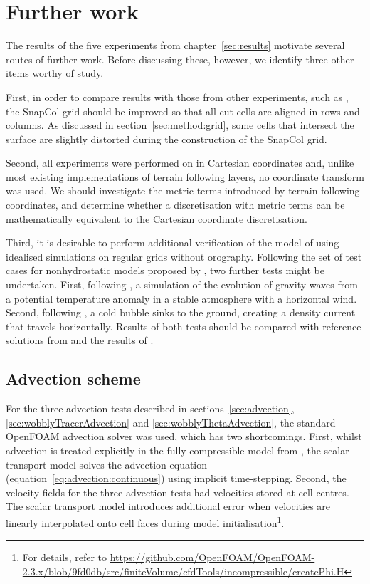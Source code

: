 \chapter{Further work} \label{sec:further-work}
The results of the five experiments from chapter~\ref{sec:results} motivate several routes of further work.  Before discussing these, however, we identify three other items worthy of study.

First, in order to compare results with those from other experiments, such as \textcite{good2013}, the SnapCol grid should be improved so that all cut cells are aligned in rows and columns.  As discussed in section~\ref{sec:method:grid}, some cells that intersect the surface are slightly distorted during the construction of the SnapCol grid.

Second, all experiments were performed on in Cartesian coordinates and, unlike most existing implementations of terrain following layers, no coordinate transform was used.  We should investigate the metric terms introduced by terrain following coordinates, and determine whether a discretisation with metric terms can be mathematically equivalent to the Cartesian coordinate discretisation.

Third, it is desirable to perform additional verification of the model of \textcite{weller-shahrokhi2014} using idealised simulations on regular grids without orography.  Following the set of test cases for nonhydrostatic models proposed by \textcite{skamarock2004}, two further tests might be undertaken.  First, following \textcite{skamarock-klemp1994}, a simulation of the evolution of gravity waves from a potential temperature anomaly in a stable atmosphere with a horizontal wind.  Second, following \textcite{straka1993}, a cold bubble sinks to the ground, creating a density current that travels horizontally.  Results of both tests should be compared with reference solutions from \textcite{skamarock-klemp1994} and the results of \textcite{jebens2011}.

\section{Advection scheme}
\label{sec:further-work:advection}

For the three advection tests described in sections~\ref{sec:advection}, \ref{sec:wobblyTracerAdvection} and \ref{sec:wobblyThetaAdvection}, the standard OpenFOAM advection solver was used, which has two shortcomings.  First, whilst advection is treated explicitly in the fully-compressible model from \textcite{weller-shahrokhi2014}, the scalar transport model solves the advection equation (equation~\ref{eq:advection:continuous}) using implicit time-stepping.  Second, the velocity fields for the three advection tests had velocities stored at cell centres.  The scalar transport model introduces additional error when velocities are linearly interpolated onto cell faces during model initialisation\footnote{For details, refer to \url{https://github.com/OpenFOAM/OpenFOAM-2.3.x/blob/9fd0db/src/finiteVolume/cfdTools/incompressible/createPhi.H}}.

